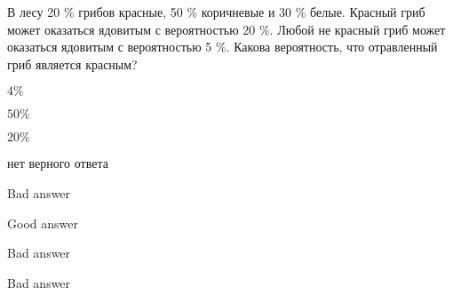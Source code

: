 
\begin{question}
В лесу 20 \% грибов красные, 50 \% коричневые и 30 \% белые.
Красный гриб может оказаться ядовитым с вероятностью 20 \%.
Любой не красный гриб может оказаться ядовитым с вероятностью 5 \%.
Какова вероятность, что отравленный гриб является красным?
\begin{answerlist}
  \item \(4 \%\)
  \item \(50 \%\)
  \item \(20 \%\)
  \item нет верного ответа
\end{answerlist}
\end{question}

\begin{solution}
\begin{answerlist}
  \item Bad answer
  \item Good answer
  \item Bad answer
  \item Bad answer
\end{answerlist}
\end{solution}

